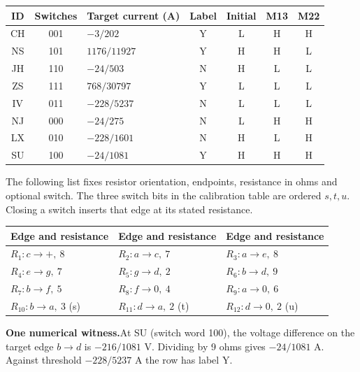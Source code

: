 \documentclass[12pt,letterpaper]{article}
\newcommand{\reading}[2]{\par\smallskip\textsf{\color{accent}\bfseries #1}\enspace #2\par}
\begin{document}
\begin{center}{\small\setlength{\tabcolsep}{4pt}\begin{tabularx}{\linewidth}{@{}ccYcccc@{}}\toprule
ID & Switches & Target current (A) & Label & Initial & M13 & M22\\ \midrule
CH & 001 & $-3/202$ & Y & L & H & H\\
NS & 101 & $1176/11927$ & Y & H & H & L\\
JH & 110 & $-24/503$ & N & H & L & L\\
ZS & 111 & $768/30797$ & Y & L & L & L\\
IV & 011 & $-228/5237$ & N & L & L & L\\
NJ & 000 & $-24/275$ & N & L & H & H\\
LX & 010 & $-228/1601$ & N & H & L & H\\
SU & 100 & $-24/1081$ & Y & H & H & H\\\bottomrule\end{tabularx}}\end{center}

The following list fixes resistor orientation, endpoints, resistance in ohms and optional switch. The three switch bits in the calibration table are ordered $s,t,u$. Closing a switch inserts that edge at its stated resistance.

\begin{center}{\footnotesize\setlength{\tabcolsep}{4pt}\begin{tabularx}{\linewidth}{@{}YYY@{}}\toprule
Edge and resistance & Edge and resistance & Edge and resistance\\ \midrule
$R_{1}\colon c\!\to\!+,\ 8$ & $R_{2}\colon a\!\to\!c,\ 7$ & $R_{3}\colon a\!\to\!e,\ 8$\\
$R_{4}\colon e\!\to\!g,\ 7$ & $R_{5}\colon g\!\to\!d,\ 2$ & $R_{6}\colon b\!\to\!d,\ 9$\\
$R_{7}\colon b\!\to\!f,\ 5$ & $R_{8}\colon f\!\to\!0,\ 4$ & $R_{9}\colon a\!\to\!0,\ 6$\\
$R_{10}\colon b\!\to\!a,\ 3$ (s) & $R_{11}\colon d\!\to\!a,\ 2$ (t) & $R_{12}\colon d\!\to\!0,\ 2$ (u)\\\bottomrule\end{tabularx}}\end{center}

\reading{One numerical witness.}{At SU (switch word 100), the voltage difference on the target edge $b\to d$ is $-216/1081$ V. Dividing by 9 ohms gives $-24/1081$ A. Against threshold $-228/5237$ A the row has label Y.}
\end{document}
